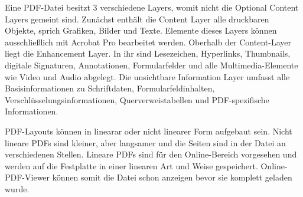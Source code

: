 \par
Eine PDF-Datei besitzt 3 verschiedene Layers, womit nicht die Optional Content Layers gemeint sind.  Zunächst enthält die Content Layer alle druckbaren Objekte, sprich Grafiken, Bilder und Texte. Elemente dieses Layers können ausschließlich mit Acrobat Pro bearbeitet werden. Oberhalb der Content-Layer liegt die Enhancement Layer. In ihr sind Lesezeichen, Hyperlinks, Thumbnails, digitale Signaturen, Annotationen, Formularfelder und alle Multimedia-Elemente wie Video und Audio abgelegt. Die unsichtbare Information Layer umfasst alle Basisinformationen zu Schriftdaten, Formularfeldinhalten, Verschlüsselungsinformationen, Querverweistabellen und PDF-spezifische Informationen. \cite{schneeberger}
\par
PDF-Layouts können in linearar oder nicht linearer Form aufgebaut sein. Nicht lineare PDFs sind kleiner, aber langsamer und die Seiten sind in der Datei an verschiedenen Stellen. Lineare PDFs sind für den Online-Bereich vorgesehen und werden auf die Festplatte in einer linearen Art und Weise gespeichert. Online-PDF-Viewer können somit die Datei schon anzeigen bevor sie komplett geladen wurde. \cite{fileformat}


